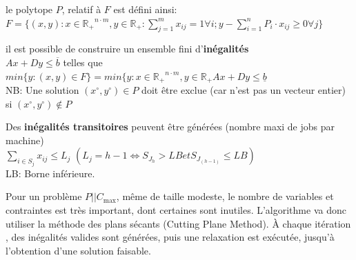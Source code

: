 \documentclass[a4paper,12pt]{report}
\theoremstyle{plain}				%
\theoremstyle{definition}				%
\newcommand\problemGrahamP{$P||C_{\max}$}
\begin{document}
\bigskip
le polytope $P$, relatif à $F$ est défini ainsi: \\
$F=\{ (x,y) : x \in \mathbb{R_+}^{n \cdot m}, y \in \mathbb{R_+} : \sum_{j=1}^{m} x_{ij}=1 \forall i;
y-\sum_{i=1}^{n} P_i \cdot x_{ij} \geq 0 \forall j	\}$

\bigskip
il est possible de construire un ensemble fini d'\textbf{inégalités} \\
$Ax+Dy \leq \overline{b}$ telles que \\
$min \{y : (x,y) \in F \} = min \{y : x \in \mathbb{R_+}^{n \cdot m}, y \in \mathbb{R_+} Ax+Dy \leq \underline{b}$ \\
NB: Une solution $(x \ensuremath{^\circ} , y\ensuremath{^\circ}) \in P$ doit être exclue (car n'est pas un vecteur entier) si $(x\ensuremath{^\circ}, y\ensuremath{^\circ}) \notin P $

\bigskip
Des \textbf{inégalités transitoires} peuvent être générées (nombre maxi de jobs par machine) \\
$\sum_{i \in S_j} x_{ij} \leq L_j$ \quad $(L_j = h-1 \iff S_{J_h} > LB et S_{J_{(h-1)}} \leq LB)$\\
LB: Borne inférieure.

\bigskip

Pour un problème \problemGrahamP, même de taille modeste, le nombre de
variables et contraintes est très important, dont certaines sont
inutiles.
L'algorithme va donc utiliser la méthode des plans sécants (Cutting
Plane Method).
\`A chaque itération , des inégalités valides sont générées, puis une
relaxation est exécutée, jusqu'à l'obtention d'une solution faisable.
\end{document}
